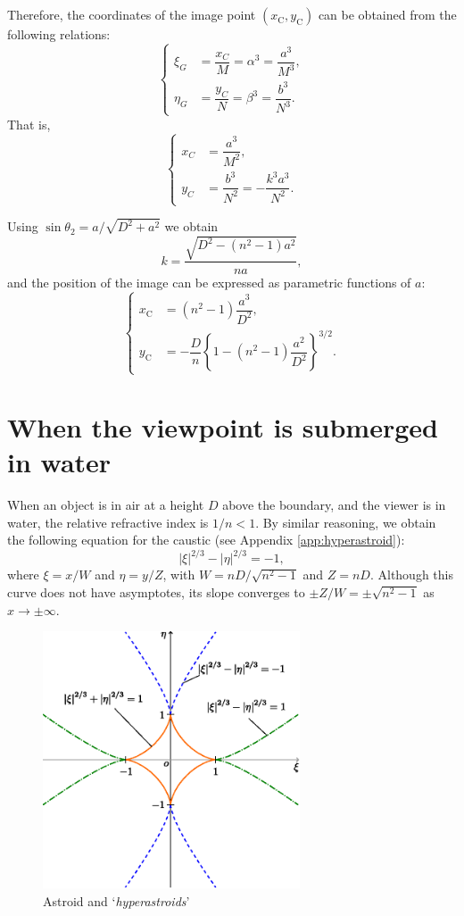 \documentclass[twocolumn]{article}
\begin{document}
Therefore, the coordinates of the image point $(x_{\mathrm{C}}^{}, y_{\mathrm{C}}^{})$ can be obtained from the following relations:
$$
\left\{
\begin{aligned}
	\xi_G &= \dfrac{x_C}{M} = \alpha^3 = \dfrac{a^3}{M^3},\\
	\eta_G &= \dfrac{y_C}{N} = \beta^3 = \dfrac{b^3}{N^3}.
\end{aligned}
\right.
$$
That is,
$$
\left\{
\begin{aligned}
	x_C &= \dfrac{a^3}{M^2},\\
	y_C &= \dfrac{b^3}{N^2}=-\dfrac{k^3a^3}{N^2}.
\end{aligned}
\right.
$$

Using 
$\sin\theta_2 = {a}/{\sqrt{D^2+a^2}}$
we obtain
$$k = \dfrac{\sqrt{D^2-(n^2-1)a^2}}{na},$$
and the position of the image can be expressed as parametric functions of $a$:
$$ \left\{ 
\begin{aligned}
	x_{\mathrm{C}}^{} &= (n^2-1)\dfrac{a^3}{D^2},\\
	y_{\mathrm{C}}^{} 
	&=-\dfrac{D}{n}\left\{ 1-(n^2-1)\dfrac{a^2}{D^2} \right\}^{3/2}.
\end{aligned}
\right.$$

\section{When the viewpoint is submerged in water}

When an object is in air at a height $D$ above the boundary, and the viewer is in water, the relative refractive index is $1/n < 1$. By similar reasoning, we obtain the following equation for the caustic (see Appendix \ref{app:hyperastroid}):
$$ \left| \xi \right|^{2/3} - \left| \eta \right|^{2/3} = -1, $$
where $\xi = {x}/{W} $ and $\eta = {y}/{Z}$, with $W = {nD}/{\sqrt{n^2-1}}$ and $Z = nD$. 
Although this curve does not have asymptotes, its slope converges to $\pm Z/W = \pm \sqrt{n^2-1}$ as $x \to \pm\infty$.

\begin{figure}
	\centering
	\includegraphics[width=3in]{figs/g254.eps}
	\caption{Astroid and `\emph{hyperastroids}'}
	\label{fig:hyperastroid}
\end{figure}
\end{document}
